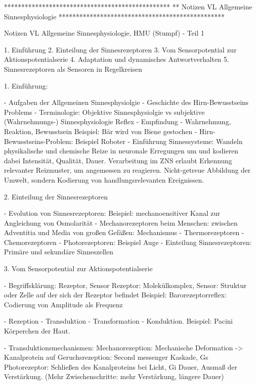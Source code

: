             
    
        


************************************************
** Notizen VL Allgemeine Sinnesphysiologie
************************************************

Notizen VL Allgemeine Sinnesphysiologie, HMU (Stumpf) - Teil 1

1. Einführung
2. Einteilung der Sinnesrezeptoren
3. Vom Sensorpotential zur Aktionspotentialserie
4. Adaptation und dynamisches Antwortverhalten
5. Sinnesrezeptoren als Sensoren in Regelkreisen


1. Einführung: 

- Aufgaben der Allgemeinen Sinnesphysiolgie
- Geschichte des Hirn-Bewusstseins Problems
- Terminologie: Objektive Sinnesphysiolgie vs subjektive (Wahrnehmungs-) Sinnesphysiologie
    Reflex - Empfindung - Wahrnehmung, Reaktion, Bewusstsein
    Beispiel: Bär wird von Biene gestochen
- Hirn-Bewusstseins-Problem: Beispiel Roboter
- Einführung Sinnessysteme: 
    Wandeln physikalische und chemische Reize in neuronale Erregungen um und kodieren dabei Intensität, Qualität, Dauer. 
    Verarbeitung im ZNS erlaubt Erkennung relevanter Reizmuster, um angemessen zu reagieren. 
    Nicht-getreue Abbildung der Umwelt, sondern Kodierung von handlungsrelevanten Ereignissen. 
  
    
2. Einteilung der Sinnesrezeptoren

- Evolution von Sinnesrezeptoren: 
    Beispiel: mechanoensitiver Kanal zur Angleichung von Osmolarität
- Mechanorezeptoren beim Menschen: zwischen Adventitia und Media von großen Gefäßen: Mechanismus
- Thermorezeptoren
- Chemorezeptoren
- Photorezeptoren: Beispiel Auge
- Einteilung Sinnesrezeptoren: Primäre und sekundäre Sinneszellen

3. Vom Sensorpotential zur Aktionspotentialserie

- Begriffsklärung: Rezeptor, Sensor
    Rezeptor: Molekülkomplex, Sensor: Struktur oder Zelle auf der sich der Rezeptor befindet
    Beispiel: Barorezeptorreflex: Codierung von Amplitude als Frequenz

- Rezeption - Transduktion - Transformation - Konduktion. Beispiel: Pacini Körperchen der Haut. 

- Transduktionsmechanismen:
    Mechanorezeption: Mechanische Deformation -> Kanalprotein auf
    Geruchsrezeption: Second messenger Kaskade, Gs
    Photorezeptor: Schließen des Kanalproteins bei Licht, Gi
    Dauer, Ausmaß der Verstärkung. (Mehr Zwischenschritte: mehr Verstärkung, längere Dauer)
    
